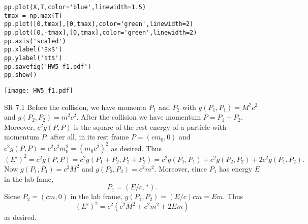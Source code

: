 \documentclass[minion]{homework}
\begin{document}
\begin{aproblems}
\begin{verbatim}
pp.plot(X,T,color='blue',linewidth=1.5)
tmax = np.max(T)
pp.plot([0,tmax],[0,tmax],color='green',linewidth=2)
pp.plot([0,-tmax],[0,tmax],color='green',linewidth=2)
pp.axis('scaled')
pp.xlabel('$x$')
pp.ylabel('$t$')
pp.savefig('HW5_f1.pdf')
pp.show()
\end{verbatim}

\texttt{[image: HW5\_f1.pdf]}

\hproblem SR 7.1
\solution
Before the collision, we have momenta $P_1$ and $P_2$ with
$g(P_1,P_1)=M^2c^2$ and $g(P_2,P_2)= m^2 c^2$. After the collision
we have momentum $P=P_1+P_2$.  Moreover, $c^2g(P,P)$ is the square
of the rest energy of a particle with momentum $P$: after all,
in its rest frame $P=(cm_0,0)$ and $c^2 g(P,P)= c^2 c^2 m_0^2 = (m_0c^2)^2$
as desired.  Thus
\[
(E')^2 = c^2 g(P,P)= c^2g(P_1+P_2,P_2+P_2) = c^2 g(P_1,P_1) + c^2 g(P_2,P_2) + 2c^2 g(P_1,P_2).
\]
Now $g(P_1,P_1)=c^2M^2$ and $g(P_2,P_2)=c^2m^2$.  Moreover,
since $P_1$ has energy $E$ in the lab fame,
\[
P_1 = (E/c,*).
\]
Sicne $P_2=(cm,0)$ in the lab frame, $g(P_1,P_2) = (E/c)cm = Em$.
Thus
\[
(E')^2 = c^2( c^2M^2 + c^2m^2 + 2Em)
\]
as desired.

\end{aproblems}
\end{document}
